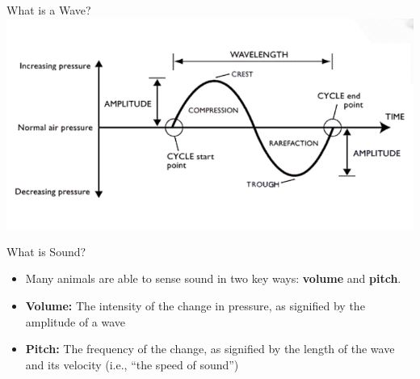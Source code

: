 \begin{frame}{What is a Wave?}
	\includegraphics[width=\linewidth,height=0.8\textheight,keepaspectratio]{wave_desc}
\end{frame}

\begin{frame}{What is Sound?}
	\begin{itemize}
		\pause\item Many animals are able to sense sound in two key ways:
		\textbf{volume} and \textbf{pitch}.
		\pause\item\textbf{Volume:} The intensity of the change in pressure, as signified by the
		amplitude of a wave
		\pause\item\textbf{Pitch:} The frequency of the change, as signified by the length of
		the wave and its velocity (i.e., “the speed of sound”)
	\end{itemize}
\end{frame}
